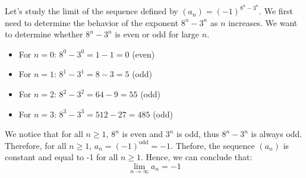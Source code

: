 \begin{eg}
    Let's study the limit of the sequence defined by \( (a_n) = (-1)^{8^n - 3^n} \). We first need to determine the behavior of the exponent \( 8^n - 3^n \) as \( n \) increases. We want to determine whether \( 8^n - 3^n \) is even or odd for large \( n \).
    \begin{itemize}[itemsep=1pt,label=$\circ$]
        \item For \( n = 0 \): \( 8^0 - 3^0 = 1 - 1 = 0 \) (even)
        \item For \( n = 1 \): \( 8^1 - 3^1 = 8 - 3 = 5 \) (odd)
        \item For \( n = 2 \): \( 8^2 - 3^2 = 64 - 9 = 55 \) (odd)
        \item For \( n = 3 \): \( 8^3 - 3^3 = 512 - 27 = 485 \) (odd)
    \end{itemize}
    We notice that for all \( n \geq 1 \), $8^n$ is even and $3^n$ is odd, thus \( 8^n - 3^n \) is always odd. Therefore, for all \( n \geq 1 \), \( a_n = (-1)^{\text{odd}} = -1 \). Thefore, the sequence \( (a_n) \) is constant and equal to -1 for all \( n \geq 1 \). Hence, we can conclude that:
    \[\lim_{n \to \infty} a_n = -1 \]
\end{eg}
